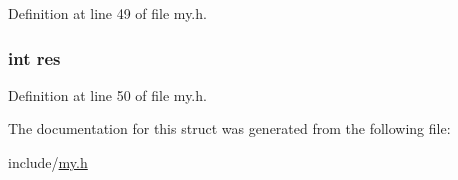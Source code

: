 Definition at line 49 of file my.\+h.

\hypertarget{structs__index_aac31eb68bff694554a182bd796b2f1c5}{
\subsubsection[{res}]{\setlength{\rightskip}{0pt plus 5cm}int res}}\label{structs__index_aac31eb68bff694554a182bd796b2f1c5}


Definition at line 50 of file my.\+h.



The documentation for this struct was generated from the following file\+:\begin{DoxyCompactItemize}
\item 
include/\hyperlink{my_8h}{my.\+h}\end{DoxyCompactItemize}
